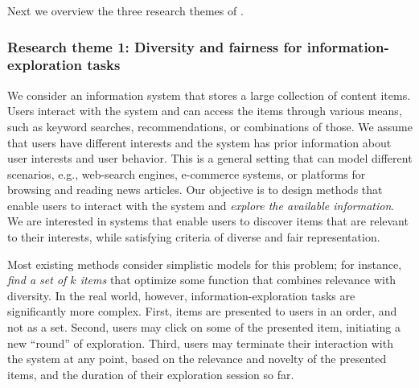 \documentclass[a4paper,11pt]{article}
\begin{document}
\iffalse
With respect to methods, 
emphasis will be given to combinatorial algorithms,
building on the previous work of the PI 
on developing combinatorial methods for data-analysis problems.
In particular, we will consider techniques such as 
combinatorial optimization, 
optimization of submodular functions, 
local-search methods, 
greedy algorithms, 
dynamic pro\-gram\-ming, 
linear-pro\-gram\-ming and semi\-def\-ini\-te-pro\-gram\-ming relaxations, 
primal-dual methods, convex optimization,
stochastic gradient descent, etc. 
Furthermore, we will explore ideas in new domains, 
such as 
algorithms with predictions~\cite{mitzenmacher2022algorithms} and
reinforcement learning.
\fi

Next we overview the three research themes of \acronym.
\vspace{-3mm}

\subsubsection*{Research theme 1: Diversity and fairness for information-exploration tasks}
\vspace{-1mm}

\iffalse
\noindent
\hspace{-3mm}\colorbox{verylightmagenta}{
\begin{minipage}{\textwidth}
\ag{do we need a summary in a box?}
\end{minipage}}

\vspace{2mm}
\fi

We consider an information system
that stores a large collection of content items.
Users interact with the system and can access the items through various means, 
such as keyword searches, recommendations, or combinations of those.
We assume that users have different interests
and the system has prior information about user interests and user behavior.
This is a general setting that can model different scenarios, 
e.g., web-search engines, e-commerce systems, 
or platforms for browsing and reading news articles.
Our objective is to design methods that enable users to 
interact with the system and 
\emph{explore the available information}.
We are interested in systems that enable users to discover items that are relevant to their interests, 
while satisfying criteria of diverse and fair representation.

Most existing methods 
consider simplistic models for this problem;
for instance, \emph{find a set of $k$ items} 
that optimize some function that combines relevance with diversity. 
In the real world, however, information-exploration tasks are significantly more complex. 
First, items are presented to users in an order, and not as a set.
Second, users may click on some of the presented item, 
initiating a new ``round'' of exploration. 
Third, users may terminate their interaction with the system at any point,
based on the relevance and novelty of the presented items,
and the duration of their exploration session so far.
\end{document}
